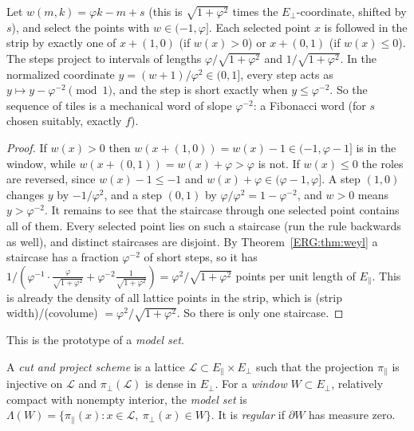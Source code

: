 \begin{proposition}\label{ERG:prop:fibchain}
Let $w(m,k)=\varphi k-m+s$ (this is $\sqrt{1+\varphi^2}$ times the $E_\perp$-coordinate, shifted by
$s$), and select the points with $w\in(-1,\varphi]$. Each selected point $x$ is followed in the strip by
exactly one of $x+(1,0)$ (if $w(x)>0$) or $x+(0,1)$ (if $w(x)\le0$). The steps project to intervals of
lengths $\varphi/\sqrt{1+\varphi^2}$ and $1/\sqrt{1+\varphi^2}$. In the normalized coordinate
$y=(w+1)/\varphi^2\in(0,1]$, every step acts as $y\mapsto y-\varphi^{-2}\pmod1$, and the step is short
exactly when $y\le\varphi^{-2}$. So the sequence of tiles is a mechanical word of slope $\varphi^{-2}$:
a Fibonacci word (for $s$ chosen suitably, exactly $f$).
\end{proposition}

\begin{proof}
If $w(x)>0$ then $w(x+(1,0))=w(x)-1\in(-1,\varphi-1]$ is in the window, while $w(x+(0,1))=w(x)+\varphi>\varphi$
is not. If $w(x)\le0$ the roles are reversed, since $w(x)-1\le-1$ and $w(x)+\varphi\in(\varphi-1,\varphi]$.
A step $(1,0)$ changes $y$ by $-1/\varphi^2$, and a step $(0,1)$ by $\varphi/\varphi^2=1-\varphi^{-2}$,
and $w>0$ means $y>\varphi^{-2}$. It remains to see that the staircase through one selected point
contains all of them. Every selected point lies on such a staircase (run the rule backwards as well), and
distinct staircases are disjoint. By Theorem~\ref{ERG:thm:weyl} a staircase has a fraction
$\varphi^{-2}$ of short steps, so it has $1/(\varphi^{-1}\cdot\frac{\varphi}{\sqrt{1+\varphi^2}}+
\varphi^{-2}\frac{1}{\sqrt{1+\varphi^2}})=\varphi^2/\sqrt{1+\varphi^2}$ points per unit length of
$E_\parallel$. This is already the density of all lattice points in the strip, which is (strip width)/(covolume) $=\varphi^2/\sqrt{1+\varphi^2}$. So there is only one staircase.
\end{proof}

This is the prototype of a \emph{model set}.

\begin{definition}
A \emph{cut and project scheme} is a lattice $\mathcal L\subset E_\parallel\times E_\perp$ such that the
projection $\pi_\parallel$ is injective on $\mathcal L$ and $\pi_\perp(\mathcal L)$ is dense in
$E_\perp$. For a \emph{window} $W\subset E_\perp$, relatively compact with nonempty interior, the
\emph{model set} is $\Lambda(W)=\{\pi_\parallel(x):x\in\mathcal L,\ \pi_\perp(x)\in W\}$. It is
\emph{regular} if $\partial W$ has measure zero.
\end{definition}

